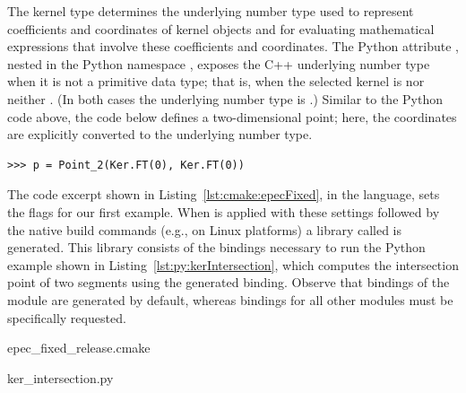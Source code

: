 The kernel type determines the underlying number type used to
represent coefficients and coordinates of kernel objects and for
evaluating mathematical expressions that involve these coefficients
and coordinates. The Python attribute , nested in the
Python namespace , exposes the C++ underlying number
type when it is not a primitive data type; that is, when the selected
kernel is nor
neither
. (In both
cases the underlying number type is .) Similar to
the Python code above, the code below defines a two-dimensional point;
here, the coordinates are explicitly converted to the underlying
number type.
\begin{lstlisting}[style=pythonStyle]
>>> p = Point_2(Ker.FT(0), Ker.FT(0))
\end{lstlisting}

The code excerpt shown in Listing~\ref{lst:cmake:epecFixed}, in the
\cmake{} language, sets the \cmake{} flags for our first example. When
 is applied with these settings followed by the
native build commands (e.g.,  on Linux platforms)
a library called  is generated. This library
consists of the bindings necessary to run the Python example shown in
Listing~\ref{lst:py:kerIntersection}, which computes the intersection
point of two segments using the generated binding. Observe that
bindings of the \iiDandiiiDGeometryKernelPackage{} module are
generated by default, whereas bindings for all other modules must be
specifically requested.

\begin{lstfloat}
  \def\filename{epec_fixed_release.cmake}%
  
                  {\cmakeDir\filename}
\end{lstfloat}

\begin{lstfloat}
  \def\filename{ker_intersection.py}%
  
                  {\pythonDir\filename}
\end{lstfloat}

